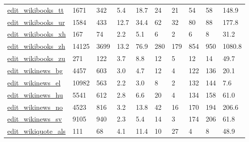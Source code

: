 \begin{longtable}{llllllllll}
 \href{http://konect.cc/networks/edit-enwikibooks}{edit\_wikibooks\_tt}                                                       & 1671       & 342   & 5.4    & 18.7   & 24    & 21     & 54     & 58     & 148.9   \\
 \href{http://konect.cc/networks/edit-enwikibooks}{edit\_wikibooks\_ur}                                                       & 1584       & 433   & 12.7   & 34.4   & 62    & 32     & 80     & 88     & 177.8   \\
 \href{http://konect.cc/networks/edit-enwikibooks}{edit\_wikibooks\_xh}                                                       & 167        & 74    & 2.2    & 5.1    & 6     & 2      & 6      & 8      & 31.2    \\
 \href{http://konect.cc/networks/edit-enwikibooks}{edit\_wikibooks\_zh}                                                       & 14125      & 3699  & 13.2   & 76.9   & 280   & 179    & 854    & 950    & 1080.8  \\
 \href{http://konect.cc/networks/edit-enwikibooks}{edit\_wikibooks\_zu}                                                       & 271        & 122   & 3.7    & 8.8    & 12    & 5      & 12     & 14     & 49.7    \\
 \href{http://konect.cc/networks/edit-enwikinews}{edit\_wikinews\_bg}                                                         & 4457       & 603   & 3.0    & 4.7    & 12    & 4      & 122    & 136    & 20.1    \\
 \href{http://konect.cc/networks/edit-enwikinews}{edit\_wikinews\_el}                                                         & 10982      & 563   & 2.2    & 3.0    & 8     & 2      & 132    & 144    & 7.6     \\
 \href{http://konect.cc/networks/edit-enwikinews}{edit\_wikinews\_hu}                                                         & 5541       & 612   & 2.8    & 6.6    & 20    & 4      & 134    & 158    & 61.0    \\
 \href{http://konect.cc/networks/edit-enwikinews}{edit\_wikinews\_no}                                                         & 4523       & 816   & 3.2    & 13.8   & 42    & 16     & 170    & 194    & 206.6   \\
 \href{http://konect.cc/networks/edit-enwikinews}{edit\_wikinews\_sv}                                                         & 9105       & 940   & 2.3    & 5.4    & 14    & 3      & 174    & 206    & 61.8    \\
 \href{http://konect.cc/networks/edit-enwikiquote}{edit\_wikiquote\_als}                                                      & 111        & 68    & 4.1    & 11.4   & 10    & 27     & 4      & 8      & 48.9    \\

\end{longtable}
